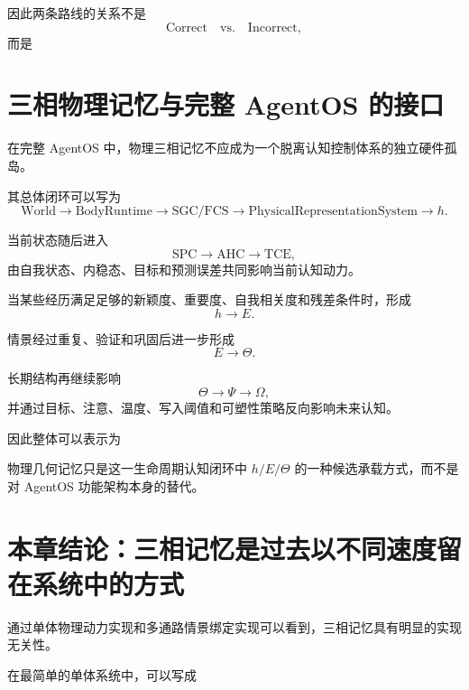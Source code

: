 因此两条路线的关系不是
\[
\mathrm{Correct}
\quad\mathrm{vs.}\quad
\mathrm{Incorrect},
\]
而是
\begin{statementbox}
\centering
{}
\end{statementbox}

\section{三相物理记忆与完整 AgentOS 的接口}

在完整 AgentOS 中，物理三相记忆不应成为一个脱离认知控制体系的独立硬件孤岛。

其总体闭环可以写为
\[
\mathrm{World}
\rightarrow
\mathrm{BodyRuntime}
\rightarrow
\mathrm{SGC/FCS}
\rightarrow
\mathrm{PhysicalRepresentationSystem}
\rightarrow
h.
\]

当前状态随后进入
\[
\mathrm{SPC}
\rightarrow
\mathrm{AHC}
\rightarrow
\mathrm{TCE},
\]
由自我状态、内稳态、目标和预测误差共同影响当前认知动力。

当某些经历满足足够的新颖度、重要度、自我相关度和残差条件时，形成
\[
h\rightarrow E.
\]

情景经过重复、验证和巩固后进一步形成
\[
E\rightarrow\Theta.
\]

长期结构再继续影响
\[
\Theta
\rightarrow
\Psi
\rightarrow
\Omega,
\]
并通过目标、注意、温度、写入阈值和可塑性策略反向影响未来认知。

因此整体可以表示为
\begin{statementbox}
\centering
{}
\end{statementbox}

物理几何记忆只是这一生命周期认知闭环中 $h/E/\Theta$ 的一种候选承载方式，而不是对 AgentOS 功能架构本身的替代。

\section{本章结论：三相记忆是过去以不同速度留在系统中的方式}

通过单体物理动力实现和多通路情景绑定实现可以看到，三相记忆具有明显的实现无关性。

在最简单的单体系统中，可以写成
\begin{statementbox}
\centering
{}
\end{statementbox}
\begin{statementbox}
\centering
{}
\end{statementbox}
\begin{statementbox}
\centering
{}
\end{statementbox}

